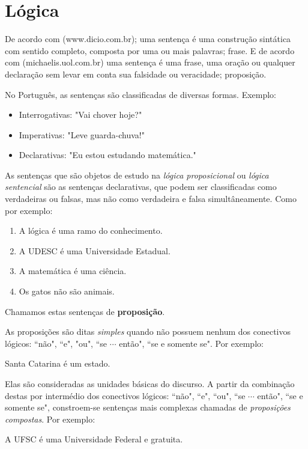 \chapter{Lógica}

De acordo com (www.dicio.com.br); uma sentença é uma construção sintática com sentido completo, composta por uma ou mais palavras; frase. E de acordo com (michaelis.uol.com.br) uma sentença é uma frase, uma oração ou qualquer declaração sem levar em conta sua falsidade ou veracidade; proposição.

No Português, as sentenças são classificadas de diversas formas. Exemplo:
\begin{itemize}
 \item Interrogativas: "Vai chover hoje?"
 \item Imperativas: "Leve guarda-chuva!"
 \item Declarativas: "Eu estou estudando matemática."
\end{itemize}

As sentenças que são objetos de estudo na \emph{lógica proposicional} ou \emph{lógica sentencial} são as sentenças declarativas, que podem ser classificadas como verdadeiras ou falsas, mas não como verdadeira e falsa simultâneamente. Como por exemplo:

\begin{enumerate}
 \item A lógica é uma ramo do conhecimento.
 \item A UDESC é uma Universidade Estadual.
 \item A matemática é uma ciência.
 \item Os gatos não são animais.
\end{enumerate}


Chamamos estas sentenças de \textbf{proposição}.

As proposições são ditas \emph{simples} quando não possuem nenhum dos conectivos lógicos: ``não", ``e", "ou", ``se $\cdots$ então", ``se e somente se". Por exemplo:
\begin{center}
Santa Catarina é um estado.
\end{center}
Elas são consideradas as unidades básicas do discurso. A partir da combinação destas por intermédio dos conectivos lógicos: ``não", ``e", ``ou", ``se $\cdots$ então", ``se e somente se", constroem-se sentenças mais complexas chamadas de \emph{proposições compostas}. Por exemplo:
\begin{center}
A UFSC é uma Universidade Federal e gratuita.
\end{center}

